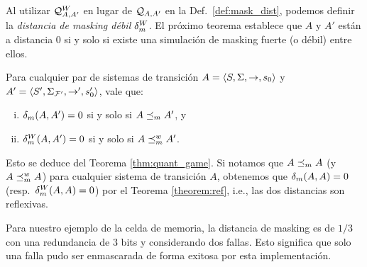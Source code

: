 Al utilizar $\mathcal{Q}^W_{A,A'}$ en lugar de $\mathcal{Q}_{A, A'}$ en la 
Def.~\ref{def:mask_dist}, podemos definir la \emph{distancia de masking débil} $\delta_{m}^W$. El próximo teorema establece que $A$ y
$A'$ están a distancia $0$ si y solo si existe una simulación de masking fuerte (o débil) entre ellos.

\begin{thm}\label{theorem:ref}
  Para cualquier par de sistemas de transición $A = \langle S, \Sigma, \rightarrow, s_0 \rangle$ y $A' = \langle S', \Sigma_{\mathcal{F'}}, \rightarrow', s'_0 \rangle$, vale que:
  \begin{enumerate}[(i)]
  \item  $\delta_{m}(A,A') = 0$ si y solo si $A \preceq_{m} A'$, y
   \item $\delta_{m}^W(A,A') = 0$ si y solo si $A \preceq^w_{m} A' $.
  \end{enumerate}
\end{thm}
%
Esto se deduce del Teorema \ref{thm:quant_game}.
Si notamos que $A \preceq_{m} A$ (y $A \preceq^w_{m} A$) para cualquier sistema de transición $A$, obtenemos que $\delta_{m}(A,A)=0$ (resp.\ $\delta_{m}^W(A,A)=0$) por el Teorema \ref{theorem:ref}, i.e., 
las dos distancias son reflexivas.

Para nuestro ejemplo de la celda de memoria, la distancia de masking es de $1/3$ 
con una redundancia de $3$ bits y considerando dos fallas. 
Esto significa que solo una falla pudo ser enmascarada de forma exitosa por esta implementación. \\


